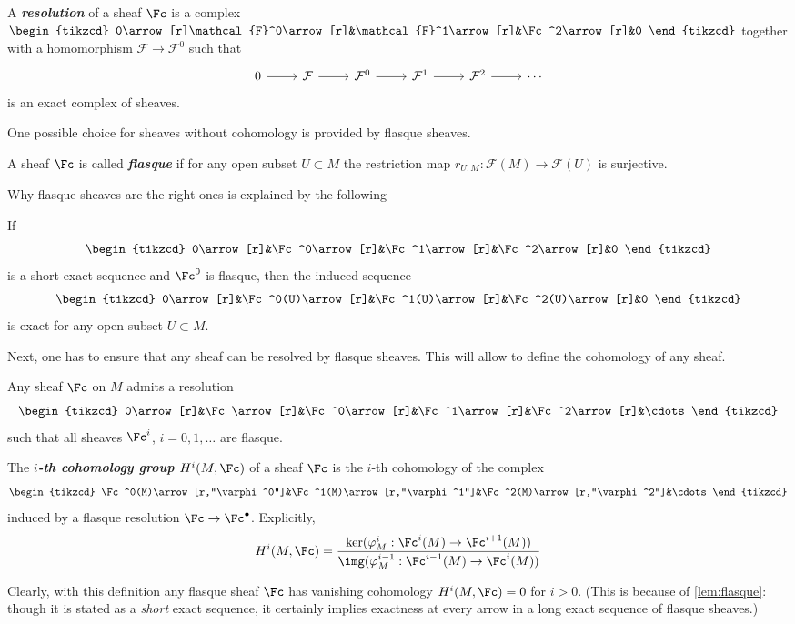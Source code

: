 \begin{defn}
	A \textbf{\textit{resolution}} of a sheaf $\Fc$ is a complex  
	$\begin{tikzcd}
		0\arrow[r]\mathcal{F}^0\arrow[r]&\mathcal{F}^1\arrow[r]&\Fc^2\arrow[r]&0
	\end{tikzcd}$ together with a homomorphism $\mathcal{F}\to\mathcal{F}^0$ such that
	\[\begin{tikzcd}
		0\arrow[r]&\mathcal{F}\arrow[r]&\mathcal{F}^0\arrow[r]&\mathcal{F}^1\arrow[r]&\mathcal{F}^2\arrow[r]&\cdots
	\end{tikzcd}\]
	is an exact complex of sheaves.
\end{defn}
One possible choice for sheaves without cohomology is provided by flasque sheaves.
\begin{defn}
	A sheaf $\Fc$ is called \textbf{\textit{flasque}} if for any open subset $U\subset M$ the restriction map $r_{U,M}:\mathcal{F}(M)\to\mathcal{F}(U)$ is surjective.
\end{defn}
Why flasque sheaves are the right ones is explained by the following
\begin{lemma}\label{lem:flasque}
	If
	\[\begin{tikzcd}
		0\arrow[r]&\Fc^0\arrow[r]&\Fc^1\arrow[r]&\Fc^2\arrow[r]&0
	\end{tikzcd}\]
	is a short exact sequence and $\Fc^0$ is flasque, then the induced sequence
	\[\begin{tikzcd}
		0\arrow[r]&\Fc^0(U)\arrow[r]&\Fc^1(U)\arrow[r]&\Fc^2(U)\arrow[r]&0
	\end{tikzcd}\]
	is exact for any open subset $U\subset M$.
\end{lemma}
Next, one has to ensure that any sheaf can be resolved by flasque sheaves. This will allow to define the cohomology of any sheaf.
\begin{prop}\label{prop:flasque-resolutions}
	Any sheaf $\Fc$ on $M$ admits a resolution
	\[\begin{tikzcd}
		0\arrow[r]&\Fc\arrow[r]&\Fc^0\arrow[r]&\Fc^1\arrow[r]&\Fc^2\arrow[r]&\cdots
	\end{tikzcd}\]
	such that all sheaves $\Fc^i$, $i=0,1,\ldots$ are flasque.
\end{prop}
\begin{defn}
	The \textbf{\textit{$i$-th cohomology group $H^i(M,\Fc)$}} of a sheaf $\Fc$ is the $i$-th cohomology of the complex
	\[\begin{tikzcd}
		\Fc^0(M)\arrow[r,"\varphi^0"]&\Fc^1(M)\arrow[r,"\varphi^1"]&\Fc^2(M)\arrow[r,"\varphi^2"]&\cdots
	\end{tikzcd}\]
	{\color{cyan}induced by a flasque resolution} $\Fc\to\Fc^\bullet$. Explicitly,
	\[H^i(M,\Fc)=\dfrac{\ker(\varphi^i_M:\Fc^i(M)\to\Fc^{i+1}(M))}{\img(\varphi^{i-1}_M:\Fc^{i-1}(M)\to\Fc^i(M))}\]
\end{defn}
Clearly, with this definition any flasque sheaf $\Fc$ has vanishing cohomology $H^i(M,\Fc)=0$ for $i>0$. (This is because of \cref{lem:flasque}: though it is stated as a \textit{short} exact sequence, it certainly implies exactness at every arrow in a long exact sequence of flasque sheaves.)


